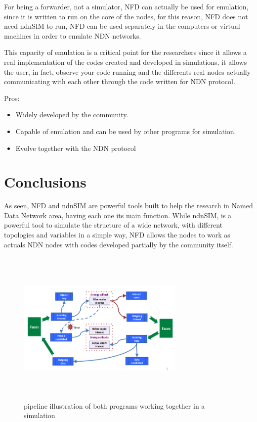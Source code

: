 \documentclass[preprint,10pt]{elsarticle}
\begin{document}
For being a forwarder, not a simulator, NFD can actually be used for emulation, since it is written to run on the core of the nodes, for this reason, NFD does not need ndnSIM to run, NFD can be used separately in the computers or virtual machines in order to emulate NDN networks.\par
This capacity of emulation is a critical point for the researchers since it allows a real implementation of the codes created and developed in simulations, it allows the user, in fact, observe your code running and the differents real nodes actually communicating with each other through the code written for NDN protocol.\par
Pros:
\begin{itemize}
		\item Widely developed by the community.
		
		\item Capable of emulation and can be used by other programs for simulation.
		
		\item Evolve together with the NDN protocol
		
	\end{itemize}
\section{Conclusions}
\label{S:3}
As seen, NFD and ndnSIM are powerful tools built to help the research in Named Data Network area, having each one its main function. While ndnSIM, is a powerful tool to simulate the structure of a wide network, with different topologies and variables in a simple way, NFD allows the nodes to work as actuals NDN nodes with codes developed partially by the community itself.\par
\begin{figure}[ht]
			\centering
			\includegraphics[height=3in, width=3.2in]{./Figures/Pipeline}
			\caption{pipeline illustration of both programs working together in a simulation}
			\label{fig:not_congested_results1}
		\end{figure} 
\end{document}
